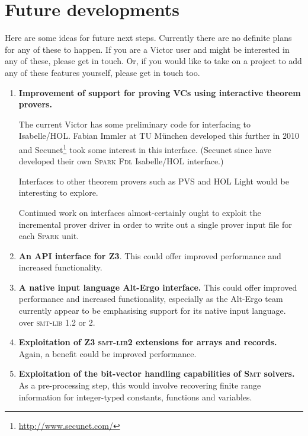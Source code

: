 \documentclass[12pt,fleqn]{article}
\newcommand{\spark}{\textsc{Spark}}
\newcommand{\zthree}{\textsc{Z}3}
\newcommand{\smt}{\textsc{Smt}}
\newcommand{\smtlib}{\textsc{smt-lib}}
\newcommand{\fdl}{\textsc{Fdl}}
\begin{document}
\section{Future developments}

Here are some ideas for future next steps.  Currently there are no
definite plans for any of these to happen.  If you are a Victor user
and might be interested in any of these, please get in touch.  Or, if
you would like to take on a project to add any of these features
yourself, please get in touch too.

\begin{enumerate}
\item \textbf{Improvement of support for proving VCs using interactive
    theorem provers.}

  The current Victor has some preliminary code for interfacing to
  Isabelle/HOL.  Fabian Immler at TU M\"unchen developed this further
  in 2010 and Secunet\footnote{\url{http://www.secunet.com/}} took
  some interest in this interface.  (Secunet since have developed
  their own \spark{} \fdl{} Isabelle/HOL interface.)
    
  Interfaces to other theorem provers such as PVS and HOL Light would
  be interesting to explore.

  Continued work on interfaces almost-certainly ought to exploit the
  incremental prover driver in order to write out a single prover
  input file for each \spark{} unit.

\item \textbf{An API interface for \zthree}.  This could offer
  improved performance and increased functionality.

\item \textbf{A native input language Alt-Ergo interface.} This could
  offer improved performance and increased functionality, especially
  as the Alt-Ergo team currently appear to be emphasising support for
  its native input language.  over \smtlib{} 1.2 or 2.

\item \textbf{Exploitation of \zthree{} \smtlib 2{} extensions for arrays and
  records.}  Again, a benefit could be improved performance.

\item \textbf{Exploitation of the bit-vector handling capabilities of \smt{}
  solvers.}  As a pre-processing step, this would involve recovering
  finite range information for integer-typed constants, functions and
  variables.


\end{enumerate}
\end{document}
